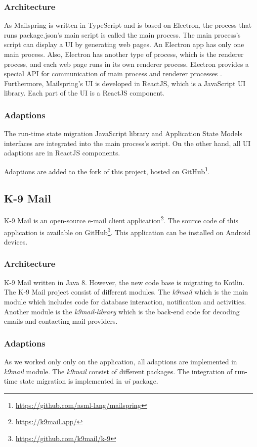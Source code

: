 \subsubsection{Architecture}
As Mailspring is written in TypeScript and is based on Electron, the process that runs package.json's main script is called the main process. The main process's script can display a UI by generating web pages. An Electron app has only one main process. Also, Electron has another type of process, which is the renderer process, and each web page runs in its own renderer process. Electron provides a special API for communication of main process and renderer processes \cite{electron}. Furthermore, Mailspring's UI is developed in ReactJS, which is a JavaScript UI library. Each part of the UI is a ReactJS component.

\subsubsection{Adaptions}
The run-time state migration JavaScript library and Application State Models interfaces are integrated into the main process's script. On the other hand, all UI adaptions are in ReactJS components. 

Adaptions are added to the fork of this project, hosted on GitHub\footnote{\url{https://github.com/asml-lang/mailspring}}. 

\subsection{K-9 Mail}
K-9 Mail is an open-source e-mail client application\footnote{\url{https://k9mail.app/}}. The source code of this application is available on GitHub\footnote{\url{https://github.com/k9mail/k-9}}. This application can be installed on Android devices.

\subsubsection{Architecture}
K-9 Mail written in Java 8. However, the new code base is migrating to Kotlin. The K-9 Mail project consist of different modules. The \textit{k9mail} which is the main module which includes code for database interaction, notification and activities. Another module is the \textit{k9mail-library} which is the back-end code for decoding emails and contacting mail providers. 

\subsubsection{Adaptions}
As we worked only only on the application, all adaptions are implemented in \textit{k9mail} module. The \textit{k9mail} consist of different packages. The integration of run-time state migration is implemented in \textit{ui} package.

